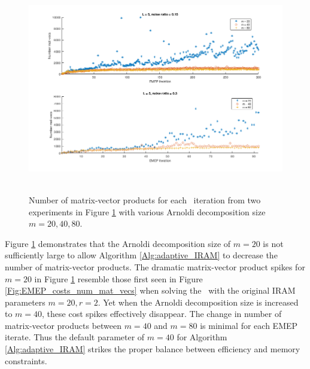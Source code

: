 \begin{figure}[H]
\centering
\hbox{\hspace{-0.9cm} \includegraphics[scale=0.6]{Numerics-num_matvecs_ada_for_m_vals} }\vspace{0.0cm}
	\caption{Number of matrix-vector products for each \emep \ iteration from two experiments in Figure \ref{Fig:Numerics-num_matvecs_ada_for_m_vals} with various Arnoldi decomposition size $m=20, 40, 80$.}
\label{Fig:Numerics-num_matvecs_ada_for_m_vals}
\end{figure}




Figure \ref{Fig:Numerics-num_matvecs_ada_for_m_vals} demonstrates that the Arnoldi decomposition size of $m=20$ is not sufficiently large to allow Algorithm \ref{Alg:adaptive_IRAM} to decrease the number of matrix-vector products.  
The dramatic matrix-vector product spikes for $m=20$ in Figure \ref{Fig:Numerics-num_matvecs_ada_for_m_vals} resemble those first seen in Figure \ref{Fig:EMEP_costs_num_mat_vecs} when solving the \emep \ with the original IRAM parameters $m=20, r=2$.
Yet when the Arnoldi decomposition size is increased to $m=40$, these cost spikes effectively disappear.
The change in number of matrix-vector products between $m=40$ and $m=80$ is minimal for each EMEP iterate.  
Thus the default parameter of $m=40$ for Algorithm \ref{Alg:adaptive_IRAM} strikes the proper balance between efficiency and memory constraints.













